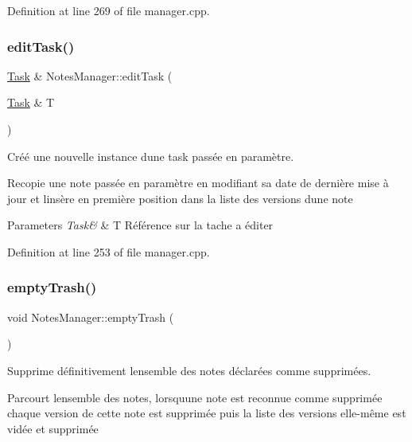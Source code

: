 Definition at line 269 of file manager.\+cpp.

\mbox{\label{class_notes_manager_a8f8f2b6aaa8c7d41356f9e4be7da2da5}} 
\subsubsection{\texorpdfstring{edit\+Task()}{editTask()}}
{\footnotesize\ttfamily \hyperlink{class_task}{Task} \& Notes\+Manager\+::edit\+Task (\begin{DoxyParamCaption}\item[{\hyperlink{class_task}{Task} \&}]{T }\end{DoxyParamCaption})}



Créé une nouvelle instance d\textquotesingle{}une task passée en paramètre. 

Recopie une note passée en paramètre en modifiant sa date de dernière mise à jour et l\textquotesingle{}insère en première position dans la liste des versions d\textquotesingle{}une note 
\begin{DoxyParams}{Parameters}
{\em Task\&} & T Référence sur la tache a éditer \\
\hline
\end{DoxyParams}


Definition at line 253 of file manager.\+cpp.

\mbox{\label{class_notes_manager_a84e962ad7fa999cbb687fb43c1b3bab4}} 
\subsubsection{\texorpdfstring{empty\+Trash()}{emptyTrash()}}
{\footnotesize\ttfamily void Notes\+Manager\+::empty\+Trash (\begin{DoxyParamCaption}{ }\end{DoxyParamCaption})}



Supprime définitivement l\textquotesingle{}ensemble des notes déclarées comme supprimées. 

Parcourt l\textquotesingle{}ensemble des notes, lorsqu\textquotesingle{}une note est reconnue comme supprimée chaque version de cette note est supprimée puis la liste des versions elle-\/même est vidée et supprimée 

